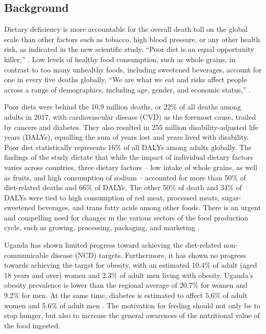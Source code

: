 \documentclass{article}
\begin{document}
\subsection{Background}
Dietary deficiency is more accountable for the overall death toll on the global scale than other factors such as tobacco, high blood pressure, or any other health risk, as indicated in the new scientific study. “Poor diet is an equal opportunity killer,” \cite{healthdata}. Low levels of healthy food consumption, such as whole grains, in contrast to too many unhealthy foods, including sweetened beverages, account for one in every five deaths globally, “We are what we eat and risks affect people across a range of demographics, including age, gender, and economic status,” \cite{healthdata}.

Poor diets were behind the 10.9 million deaths, or 22\% of all deaths among adults in 2017, with cardiovascular disease (CVD) as the foremost cause, trailed by cancers and diabetes. They also resulted in 255 million disability-adjusted life years (DALYs), equalling the sum of years lost and years lived with disability. Poor diet statistically represents 16\% of all DALYs among adults globally. The findings of the study dictate that while the impact of individual dietary factors varies across countries, three dietary factors – low intake of whole grains, as well as fruits, and high consumption of sodium – accounted for more than 50\% of diet-related deaths and 66\% of DALYs. The other 50\% of death and 34\% of DALYs were tied to high consumption of red meat, processed meats, sugar-sweetened beverages, and trans fatty acids among other foods. There is an urgent and compelling need for changes in the various sectors of the food production cycle, such as growing, processing, packaging, and marketing \cite{healthdata}.

Uganda has shown limited progress toward achieving the diet-related non-communicable disease (NCD) targets. Furthermore, it has shown no progress towards achieving the target for obesity, with an estimated 10.4\% of adult (aged 18 years and over) women and 2.3\% of adult men living with obesity. Uganda's obesity prevalence is lower than the regional average of 20.7\% for women and 9.2\% for men. At the same time, diabetes is estimated to affect 5.6\% of adult women and 5.6\% of adult men \cite{globalnutritionreport}. The motivation for feeding should not only be to stop hunger, but also to increase the general awareness of the nutritional value of the food ingested.
\end{document}
